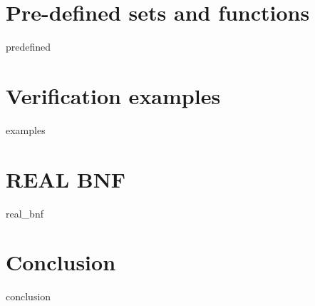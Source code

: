 \documentclass[a4paper,10pt]{article}
\begin{document}



\section {Pre-defined sets and functions}
\label {predefined}
 {predefined}

\section {Verification examples}

\label {examples}

 {examples}


\section {REAL BNF}
 {real_bnf}

\section {Conclusion}
 {conclusion}



\end{document}
